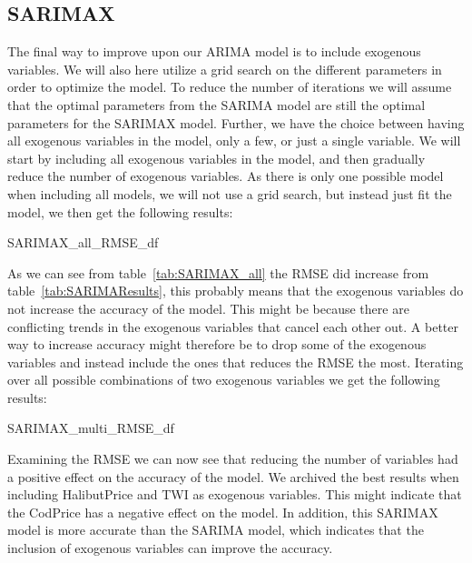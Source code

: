 \subsection{SARIMAX}\label{sec:sarimax}
The final way to improve upon our ARIMA model is to include exogenous variables. We will also here utilize a grid search on the different parameters in order to optimize the model. To reduce the number of iterations we will assume that the optimal parameters from the SARIMA model are still the optimal parameters for the SARIMAX model. Further, we have the choice between having all exogenous variables in the model, only a few, or just a single variable. We will start by including all exogenous variables in the model, and then gradually reduce the number of exogenous variables. As there is only one possible model when including all models, we will not use a grid search, but instead just fit the model, we then get the following results:
\begin{table}[H]
    \begin{center}
        {SARIMAX_all_RMSE_df}
        \caption{Result from SARIMAX model with all exogenous variables.}\label{tab:SARIMAX_all}
    \end{center}
\end{table}
As we can see from table~\ref{tab:SARIMAX_all} the RMSE did increase from table~\ref{tab:SARIMAResults}, this probably means that the exogenous variables do not increase the accuracy of the model. This might be because there are conflicting trends in the exogenous variables that cancel each other out. A better way to increase accuracy might therefore be to drop some of the exogenous variables and instead include the ones that reduces the RMSE the most. Iterating over all possible combinations of two exogenous variables we get the following results:
\begin{table}[H]
    \begin{center}
        {SARIMAX_multi_RMSE_df}
        \caption{Result from SARIMAX model with two exogenous variables.}\label{tab:SARIMAX_multi}
    \end{center}
\end{table}
Examining the RMSE we can now see that reducing the number of variables had a positive effect on the accuracy of the model. We archived the best results when including HalibutPrice and TWI as exogenous variables. This might indicate that the CodPrice has a negative effect on the model. In addition, this SARIMAX model is more accurate than the SARIMA model, which indicates that the inclusion of exogenous variables can improve the accuracy. 


